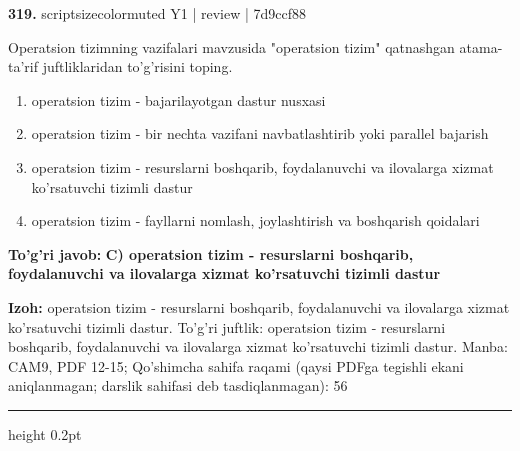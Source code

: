 \documentclass[10pt,a4paper]{article}
\begin{document}
{\bfseries\sffamily\color{ink} 319.} {scriptsizecolor{muted} Y1 | review | 7d9ccf88}
\par
Operatsion tizimning vazifalari mavzusida "operatsion tizim" qatnashgan atama-ta'rif juftliklaridan to'g'risini toping.
\begin{enumerate}[label=\Alph*),leftmargin=9mm]
\item operatsion tizim - bajarilayotgan dastur nusxasi
\item operatsion tizim - bir nechta vazifani navbatlashtirib yoki parallel bajarish
\item operatsion tizim - resurslarni boshqarib, foydalanuvchi va ilovalarga xizmat ko'rsatuvchi tizimli dastur
\item operatsion tizim - fayllarni nomlash, joylashtirish va boshqarish qoidalari
\end{enumerate}
\begin{tcolorbox}[enhanced,breakable,colback=teal!4,colframe=teal!60!black,boxrule=0.45pt,arc=1.2mm,left=2.7mm,right=2.7mm,top=1.8mm,bottom=1.8mm,before skip=2mm,after skip=2mm]
{\bfseries\sffamily\color{teal}To'g'ri javob:} \textbf{C) operatsion tizim - resurslarni boshqarib, foydalanuvchi va ilovalarga xizmat ko'rsatuvchi tizimli dastur}
\par\smallskip
{\bfseries Izoh:} operatsion tizim - resurslarni boshqarib, foydalanuvchi va ilovalarga xizmat ko'rsatuvchi tizimli dastur. To'g'ri juftlik: operatsion tizim - resurslarni boshqarib, foydalanuvchi va ilovalarga xizmat ko'rsatuvchi tizimli dastur. Manba: CAM9, PDF 12-15; Qo'shimcha sahifa raqami (qaysi PDFga tegishli ekani aniqlanmagan; darslik sahifasi deb tasdiqlanmagan): 56
\end{tcolorbox}
\vspace{2mm}\hrule height 0.2pt\vspace{3mm}
\end{document}
